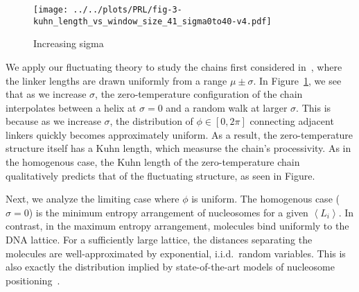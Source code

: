 \documentclass[%
 reprint,
superscriptaddress,
showpacs,preprintnumbers,
 amsmath,amssymb,
 aps,
 prl,
]{revtex4-1}
\newcommand{\meanli}{\left\langle{}L_i\right\rangle}
\begin{document}
\begin{figure}
    \centering
    \texttt{[image: ../../plots/PRL/fig-3-kuhn\_length\_vs\_window\_size\_41\_sigma0to40-v4.pdf]}
    \caption{Increasing sigma}\label{fig:hetero-geom}
\end{figure}

We apply our fluctuating theory to study the chains first considered
    in~\cite{woodcock1993}, where the linker lengths are drawn uniformly from a
    range $\mu \pm \sigma$.
In Figure~\ref{fig:hetero-geom}, we see that as we increase $\sigma$, the
    zero-temperature configuration of the chain interpolates between a helix at
    $\sigma = 0$ and a random walk at larger $\sigma$.
This is because as we increase $\sigma$, the distribution of $\phi \in [0, 2\pi]$ connecting
    adjacent linkers quickly becomes approximately uniform.
%
As a result, the zero-temperature structure itself has a Kuhn length, which measurse
the chain's processivity.
As in the homogenous case, the Kuhn length of the
zero-temperature chain qualitatively predicts that of the fluctuating structure,
as seen in Figure.

Next, we analyze the limiting case where $\phi$ is uniform.
The homogenous case ($\sigma=0$) is the
    minimum entropy arrangement of nucleosomes for a given $\meanli$. In
    contrast, in the maximum entropy arrangement, molecules bind uniformly to
    the DNA lattice. For a sufficiently large lattice, the distances separating the
    molecules are well-approximated by exponential, i.i.d.\ random variables.
This is also exactly the distribution implied by  state-of-the-art models of nucleosome
    positioning~\cite{beshnova2014}.
\end{document}
